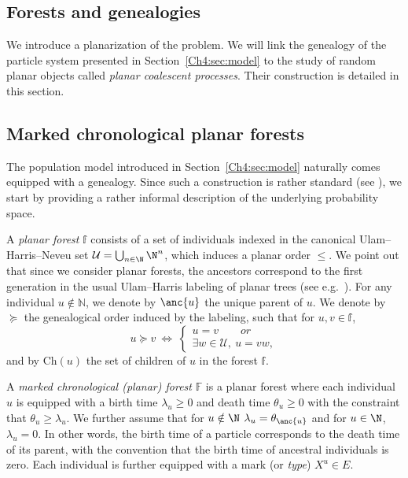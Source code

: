 \begin{refsegment}
\section{Forests and genealogies}\label{Ch4:sec:objects}

We introduce a planarization of the problem. We will link the genealogy of the particle system presented in Section~\ref{Ch4:sec:model} to the study of random planar objects called \emph{planar coalescent processes}. Their construction is detailed in this section.

\subsection{Marked chronological planar forests}\label{Ch4:sec:Ulam_Harris}
The population model introduced in Section~\ref{Ch4:sec:model} naturally comes equipped with a genealogy. Since such a construction is rather standard (see \eg \citet{neveu_arbres_1986, otter_multiplicative_1949}), we start by providing a rather informal description of the underlying probability space. 

A {\it planar forest} $\mathbb{f}$ consists of a set of individuals indexed in the canonical Ulam--Harris--Neveu set $\mathcal{U}=\bigcup_{n\in\N}\N^n$, which induces a
planar order $\leq$. We point out that since we consider planar forests, the ancestors correspond to the first generation in the usual Ulam--Harris labeling of planar trees (see e.g.\ \cite{le_gall_random_2005}).
For any individual $u \notin \mathbb{N}$, we denote by $\anc{u}$ the unique parent of $u$.  We denote by $\succcurlyeq$ the genealogical order induced by the labeling, such that for $u,v\in\mathbb{f}$,
\[
u\succcurlyeq v\ \iff\ \begin{cases}
u=v\qquad \textit{or}\\
\exists w\in \mathcal{U},\ u=vw,
\end{cases}
\]
and by $\mathrm{Ch}(u)$ the set of 
children of $u$ in the forest $\mathbb{f}$.


A {\it  marked chronological (planar) forest} $\mathbb{F}$ is a planar forest where each individual $u$ is equipped with a birth time $\lambda_u \geq0$ and death time $\theta_u\geq0$ with the constraint that 
$\theta_u \geq \lambda_u$. We further assume that for $u\notin\N$  $\lambda_u=\theta_{\anc{u}}$ and for $u\in\N$, $\lambda_u=0$. In other words, the birth time of a particle corresponds to the death time of its parent, with the convention that the birth time of ancestral individuals is zero. Each individual is further equipped  with a mark (or {\it type})  $X^u\in E$. 


\end{refsegment}
